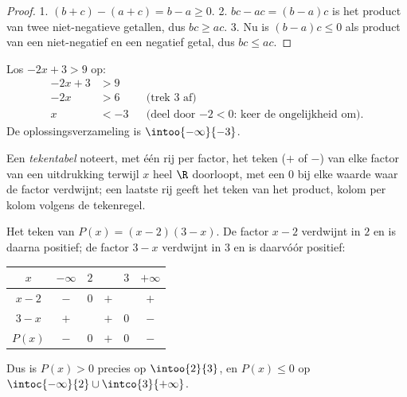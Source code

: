 \begin{proof}
1. $(b + c) - (a + c) = b - a \geq 0$.
2. $bc - ac = (b-a)c$ is het product van twee niet-negatieve getallen, dus
$bc \geq ac$.
3. Nu is $(b-a)c \leq 0$ als product van een niet-negatief en een negatief
getal, dus $bc \leq ac$.
\end{proof}

\begin{example}\label{ex:g10:algebra:firstineq}
Los $-2x + 3 > 9$ op:
\begin{align*}
-2x + 3 &> 9 \\
-2x &> 6 && \text{(trek 3 af)} \\
x &< -3 && \text{(deel door $-2 < 0$: keer de ongelijkheid om).}
\end{align*}
De oplossingsverzameling is $\intoo{-\infty}{-3}$.
\end{example}

\begin{definition}[Tekentabel]\label{def:g10:algebra:signtable}
Een \emph{tekentabel} noteert, met één rij per factor, het
teken ($+$ of $-$) van elke factor van een uitdrukking terwijl $x$ heel $\R$
doorloopt, met een $0$ bij elke waarde waar de factor verdwijnt; een laatste
rij geeft het teken van het product, kolom per kolom volgens de tekenregel.
\end{definition}

\begin{example}\label{ex:g10:algebra:signtable}
Het teken van $P(x) = (x - 2)(3 - x)$. De factor $x - 2$ verdwijnt in $2$ en
is daarna positief; de factor $3 - x$ verdwijnt in $3$ en is daarvóór
positief:
\begin{center}
\renewcommand{\arraystretch}{1.3}
\begin{tabular}{c|ccccc}
$x$ & $-\infty$ \quad & $2$ & & $3$ & \quad $+\infty$ \\
\hline
$x - 2$ & $-$ & $0$ & $+$ & & $+$ \\
$3 - x$ & $+$ & & $+$ & $0$ & $-$ \\
\hline
$P(x)$ & $-$ & $0$ & $+$ & $0$ & $-$ \\
\end{tabular}
\end{center}
Dus is $P(x) > 0$ precies op $\intoo{2}{3}$, en $P(x) \leq 0$ op
$\intoc{-\infty}{2} \cup \intco{3}{+\infty}$.
\end{example}

